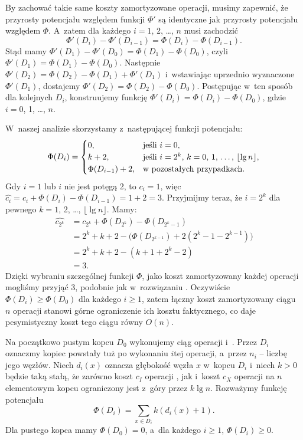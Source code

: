 
\exercise %
By zachować takie same koszty zamortyzowane operacji, musimy zapewnić, że przyrosty potencjału względem funkcji $\Phi'$ są identyczne jak przyrosty potencjału względem $\Phi$.
A~zatem dla każdego $i=1$, 2, \dots, $n$ musi zachodzić
\[
	\Phi'(D_i)-\Phi'(D_{i-1}) = \Phi(D_i)-\Phi(D_{i-1}).
\]
Stąd mamy $\Phi'(D_1)-\Phi'(D_0)=\Phi(D_1)-\Phi(D_0)$, czyli $\Phi'(D_1)=\Phi(D_1)-\Phi(D_0)$.
Następnie $\Phi'(D_2)=\Phi(D_2)-\Phi(D_1)+\Phi'(D_1)$ i~wstawiając uprzednio wyznaczone $\Phi'(D_1)$, dostajemy $\Phi'(D_2)=\Phi(D_2)-\Phi(D_0)$.
Postępując w~ten sposób dla kolejnych $D_i$, konstruujemy funkcję $\Phi'(D_i)=\Phi(D_i)-\Phi(D_0)$, gdzie $i=0$, 1, \dots, $n$.

\exercise %
W~naszej analizie skorzystamy z~następującej funkcji potencjału:
\[
	\Phi(D_i) = \begin{cases}
		0, & \text{jeśli $i=0$}, \\
		k+2, & \text{jeśli $i=2^k$, $k=0$, 1, \dots, $\lfloor\lg n\rfloor$}, \\
		\Phi(D_{i-1})+2, & \text{w~pozostałych przypadkach}.
	\end{cases}
\]
Gdy $i=1$ lub $i$ nie jest potęgą 2, to $c_i=1$, więc $\widehat{c_i}=c_i+\Phi(D_i)-\Phi(D_{i-1})=1+2=3$.
Przyjmijmy teraz, że $i=2^k$ dla pewnego $k=1$, 2, \dots, $\lfloor\lg n\rfloor$.
Mamy:
\begin{align*}
	\widehat{c_{2^k}} &= c_{2^k}+\Phi(D_{2^k})-\Phi(D_{2^k-1}) \\
	&= 2^k+k+2-\bigl(\Phi(D_{2^{k-1}})+2(2^k-1-2^{k-1})\bigr) \\
	&= 2^k+k+2-(k+1+2^k-2) \\
	&= 3.
\end{align*}
Dzięki wybraniu szczególnej funkcji $\Phi$, jako koszt zamortyzowany każdej operacji mogliśmy przyjąć 3, podobnie jak w~rozwiązaniu .
Oczywiście $\Phi(D_i)\ge\Phi(D_0)$ dla każdego $i\ge1$, zatem łączny koszt zamortyzowany ciągu $n$ operacji stanowi górne ograniczenie ich kosztu faktycznego, co daje pesymistyczny koszt tego ciągu równy $O(n)$.

\exercise %
Na początkowo pustym kopcu $D_0$ wykonujemy ciąg operacji  i~.
Przez $D_i$ oznaczmy kopiec powstały tuż po wykonaniu $i$\nbhyphen tej operacji, a~przez $n_i$ -- liczbę jego węzłów.
Niech $d_i(x)$ oznacza głębokość węzła $x$ w~kopcu $D_i$ i~niech $k>0$ będzie taką stałą, że zarówno koszt $c_I$ operacji , jak i~koszt $c_X$ operacji  na $n$\nbhyphen elementowym kopcu ograniczony jest z~góry przez $k\lg n$.
Rozważymy funkcję potencjału
\[
	\Phi(D_i) = \sum_{x\in D_i}k(d_i(x)+1).
\]
Dla pustego kopca mamy $\Phi(D_0)=0$, a~dla każdego $i\ge1$, $\Phi(D_i)\ge0$.

